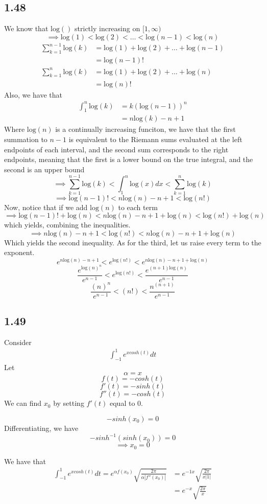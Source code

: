 \documentclass[letterpaper,12pt]{article}
\theoremstyle{definition}
\begin{document}
\subsection*{1.48}
We know that $\text{log} () $ strictly increasing on $[1, \infty)$ 
\[ \implies \text{log} (1) <\text{log} (2) < \dots<\text{log} (n-1) <\text{log} (n) \]
 \begin{align*}
     \sum^{n-1}_{k=1}  \text{log} (k)  &= \text{log} (1) + \text{log} (2) + \dots + \text{log} (n-1) 
     \\&= \text{log}(n-1)! 
     \\\sum^{n}_{k=1}  \text{log} (k)  &= \text{log} (1) + \text{log} (2) + \dots + \text{log} (n) 
     \\&= \text{log}(n)! 
 \end{align*}
 Also, we have that
 \begin{align*}
     \int^{n}_{1}\text{log} (k) &= k ( \text{log} (n-1))^n
     \\&= n \text{log} (k) - n + 1
 \end{align*}
 Where $\text{log} (n)$ is a continually increasing funciton, we have that the first summation to $n-1$ is equivalent to the Riemann sums evaluated at the left endpoints of each interval, and the second sum corresponds to the right endpoints, meaning that the first is a lower bound on the true integral, and the second is an upper bound
 \[ \implies \sum^{n-1}_{k=1} \text{log} (k) < \int^{n}_{1} \text{log} (x) dx < \sum^{n}_{k=1} \text{log} (k)\]
 \[ \implies \text{log} (n-1)! < n\text{log} (n) -n+1 <  \text{log} (n!)\]
 Now, notice that if we add $\text{log} (n) $ to each term
 \[ \implies \text{log} (n-1)! + \text{log} (n)  < n\text{log} (n) -n+1+ \text{log} (n) <  \text{log} (n!)+ \text{log} (n)\]
 which yields, combining the inequalities.
 \[ \implies n\text{log} (n) -n+1 <  \text{log} (n!) < n\text{log} (n) -n+1+ \text{log} (n) \]
Which yields the second inequality. As for the third, let us raise every term to the exponent.
\[ e^{n\text{log} (n) -n+1} < e^{ \text{log} (n!) }< e^{n\text{log} (n) -n+1+ \text{log} (n)} \]
\[ \frac{e^{\text{log} (n)^n}}{e^{ n-1}} < e^{ \text{log} (n!) } < \frac{e^{(n+1) \text{log} (n)}}{e^{n-1}} \]
\[ \frac{ (n)^n}{e^{ n-1}} < (n!) <  \frac{n^{(n+1)}  }{e^{n-1}} \]

\subsection*{1.49}
Consider
\begin{align*}
    \int^{1}_{-1} e^{x cosh(t)} dt 
\end{align*}
Let 
\[\alpha = x\]
\[f(t) = -cosh(t)\]
\[f'(t) = -sinh(t)\]
\[f''(t) = -cosh(t)\]
We can find $x_0$ by setting $f'(t)$ equal to $0$.

\[-sinh(x_0) = 0\]
Differentiating, we have
\[-sinh^{-1}(sinh(x_0)) = 0\]
\[ \implies x_0 = 0\]

We have that 
\begin{align*}
    \int^{1}_{-1} e^{x cosh(t)} dt = e^{\alpha f(x_0)} \sqrt{\frac{2 \pi}{ \alpha|f''(x_0) |}}
    &=e^{-1x} \sqrt{\frac{2 \pi}{ x |1 |}}
    \\&=e^{-x} \sqrt{\frac{2 \pi}{ x }}
\end{align*}
\end{document}
